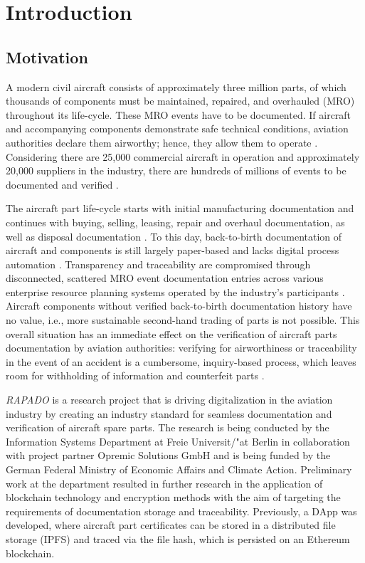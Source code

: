 \chapter{Introduction}
\citet{semesterproject}
\section{Motivation}
A modern civil aircraft consists of approximately three million parts, of which thousands of components must be maintained, repaired, and overhauled (MRO) throughout its life-cycle. These MRO events have to be documented. If aircraft and accompanying components demonstrate safe technical conditions, aviation authorities declare them airworthy; hence, they allow them to operate \citep{FornaconFrank}. Considering there are 25,000 commercial aircraft in operation and approximately 20,000 suppliers in the industry, there are hundreds of millions of events to be documented and verified \citep{mroBCservices1}.

The aircraft part life-cycle starts with initial manufacturing documentation and continues with buying, selling, leasing, repair and overhaul documentation, as well as disposal documentation \citep{FornaconFrank, mroBCservices}. To this day, back-to-birth documentation of aircraft and components is still largely paper-based and lacks digital process automation \citep{efthymiou}. Transparency and traceability are compromised through disconnected, scattered MRO event documentation entries across various enterprise resource planning systems operated by the industry's participants \citep{FornaconFrank, mroBCservices1}. Aircraft components without verified back-to-birth documentation history have no value, i.e., more sustainable second-hand trading of parts is not possible. This overall situation has an immediate effect on the verification of aircraft parts documentation by aviation authorities: verifying for airworthiness or traceability in the event of an accident is a cumbersome, inquiry-based process, which leaves room for withholding of information and counterfeit parts \citep{planecrash, efthymiou}.

\textit{RAPADO} is a research project that is driving digitalization in the aviation industry by creating an industry standard for seamless documentation and verification of aircraft spare parts. The research is being conducted by the Information Systems Department at Freie Universit{/"a}t Berlin in collaboration with project partner Opremic Solutions GmbH and is being funded by the German Federal Ministry of Economic Affairs and Climate Action. Preliminary work at the department resulted in further research in the application of blockchain technology and encryption methods with the aim of targeting the requirements of documentation storage and traceability. Previously, a DApp was developed, where aircraft part certificates can be stored in a distributed file storage (IPFS) and traced via the file hash, which is persisted on an Ethereum blockchain.

